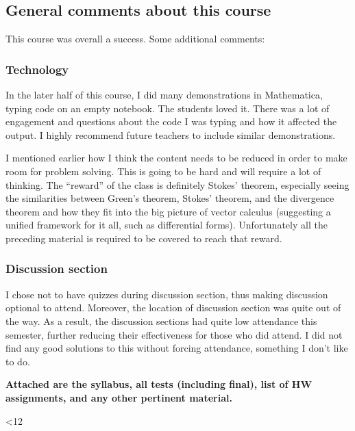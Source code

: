 \documentclass[11pt,oneside]{amsart}
\begin{document}
\subsection{General comments about this course}
This course was overall a success. Some additional comments:
\subsubsection{Technology}
In the later half of this course, I did many demonstrations in Mathematica, typing code on an empty notebook. The students loved it. There was a lot of engagement and questions about the code I was typing and how it affected the output. I highly recommend future teachers to include similar demonstrations.

I mentioned earlier how I think the content needs to be reduced in order to make room for problem solving. This is going to be hard and will require a lot of thinking. The ``reward'' of the class is definitely Stokes' theorem, especially seeing the similarities between Green's theorem, Stokes' theorem, and the divergence theorem and how they fit into the big picture of vector calculus (suggesting a unified framework for it all, such as differential forms). Unfortunately all the preceding material is required to be covered to reach that reward.

\subsubsection{Discussion section}
I chose not to have quizzes during discussion section, thus making discussion optional to attend. Moreover, the location of discussion section was quite out of the way. As a result, the discussion sections had quite low attendance this semester, further reducing their effectiveness for those who did attend. I did not find any good solutions to this without forcing attendance, something I don't like to do.

\vspace{0pt plus 1fill}
\noindent
\textbf{Attached are the syllabus, all tests (including final), list of
  HW assignments, and any other pertinent material.}
\newpage






\setcounter{int}{1}
\loop

\addtocounter{int}{1}
\ifnum \value{int}<12
\repeat
\end{document}
